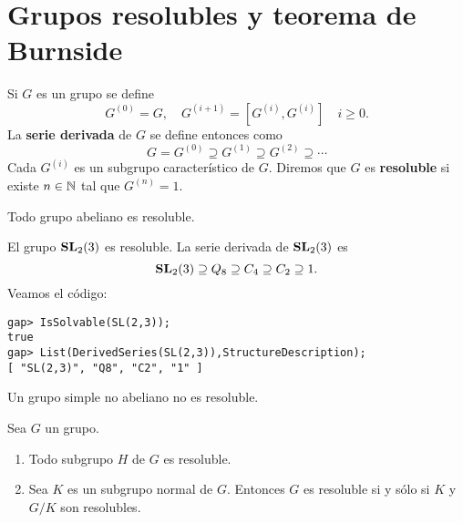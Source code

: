 \chapter{Grupos resolubles y teorema de Burnside}

Si $G$ es un grupo se define 
\[
		G^{(0)}=G,\quad
		G^{(i+1)}=[G^{(i)},G^{(i)}]\quad i\geq0.
\]
La \textbf{serie derivada} de $G$ se define entonces como
\[
G=G^{(0)}\supseteq G^{(1)}\supseteq G^{(2)}\supseteq\cdots
\]
Cada $G^{(i)}$ es un subgrupo característico de $G$. Diremos que
$G$ es \textbf{resoluble} si existe $n\in\mathbb{N}$ tal que $G^{(n)}=1$. 


\begin{example}
	Todo grupo abeliano es resoluble.
\end{example}

\begin{example}
	El grupo $\mathbf{SL}_2(3)$ es resoluble. La serie derivada de $\mathbf{SL}_2(3)$ es
	\[
	\mathbf{SL}_2(3)\supseteq Q_8\supseteq C_4\supseteq C_2\supseteq 1.
	\]
	Veamos el código:
\begin{lstlisting}
gap> IsSolvable(SL(2,3));
true
gap> List(DerivedSeries(SL(2,3)),StructureDescription);
[ "SL(2,3)", "Q8", "C2", "1" ]
\end{lstlisting}
\end{example}

\begin{example}
	Un grupo simple no abeliano no es resoluble. 
\end{example}

\begin{theorem}
	\label{theorem:resoluble}
	Sea $G$ un grupo. 
	\begin{enumerate}
		\item Todo subgrupo $H$ de $G$ es resoluble. 
		\item Sea $K$ es un subgrupo normal de $G$. Entonces $G$ es resoluble
			si y sólo si $K$ y $G/K$ son resolubles.
	\end{enumerate}
\end{theorem}

